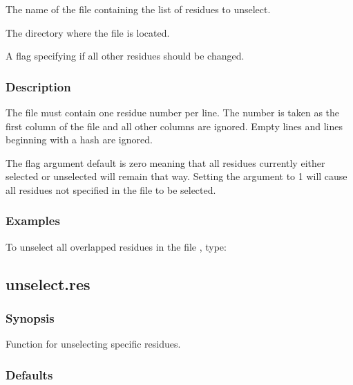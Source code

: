    The name of the file containing the list of residues to unselect.   

   The directory where the file is located.   

   A flag specifying if all other residues should be changed.  

  

  
 \subsubsection{Description} 

 The file must contain one residue number per line.  The number is taken as the first column of the file and all other columns are ignored.  Empty lines and lines beginning with a hash are ignored. 
  

 The  flag argument default is zero meaning that all residues currently either selected or unselected will remain that way.  Setting the argument to 1 will cause all residues not specified in the file to be selected. 
  

  
 \subsubsection{Examples} 

 To unselect all overlapped residues in the file , type: 
  



  

 \newpage 

 \subsection{unselect.res} 

  
 \subsubsection{Synopsis} 

 Function for unselecting specific residues. 
  

  
 \subsubsection{Defaults} 

